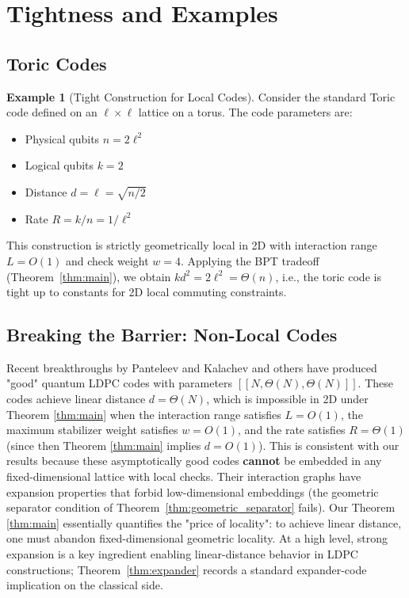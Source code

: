 \documentclass[11pt,a4paper]{article}
\theoremstyle{definition}
\newtheorem{example}[theorem]{Example}
\theoremstyle{remark}
\begin{document}
\section{Tightness and Examples}

\subsection{Toric Codes}
\begin{example}[Tight Construction for Local Codes]
Consider the standard Toric code defined on an $\ell \times \ell$ lattice on a torus.
The code parameters are:
\begin{itemize}
    \item Physical qubits $n = 2\ell^2$
    \item Logical qubits $k = 2$
    \item Distance $d = \ell = \sqrt{n/2}$
    \item Rate $R = k/n = 1/\ell^2$
\end{itemize}
This construction is strictly geometrically local in 2D with interaction range $L=O(1)$ and check weight $w=4$.
Applying the BPT tradeoff (Theorem~\ref{thm:main}), we obtain $k d^2 = 2\ell^2 = \Theta(n)$, i.e., the toric code is tight up to constants for 2D local commuting constraints.
\end{example}

\subsection{Breaking the Barrier: Non-Local Codes}
Recent breakthroughs by Panteleev and Kalachev \cite{PK} and others have produced "good" quantum LDPC codes with parameters $[[N, \Theta(N), \Theta(N)]]$. These codes achieve linear distance $d = \Theta(N)$, which is impossible in 2D under Theorem \ref{thm:main} when the interaction range satisfies $L=O(1)$, the maximum stabilizer weight satisfies $w=O(1)$, and the rate satisfies $R=\Theta(1)$ (since then Theorem \ref{thm:main} implies $d=O(1)$).
This is consistent with our results because these asymptotically good codes \textbf{cannot} be embedded in any fixed-dimensional lattice with local checks. Their interaction graphs have expansion properties that forbid low-dimensional embeddings (the geometric separator condition of Theorem~\ref{thm:geometric_separator} fails).
Our Theorem \ref{thm:main} essentially quantifies the "price of locality": to achieve linear distance, one must abandon fixed-dimensional geometric locality.
At a high level, strong expansion is a key ingredient enabling linear-distance behavior in LDPC constructions; Theorem~\ref{thm:expander} records a standard expander-code implication on the classical side.
\end{document}
